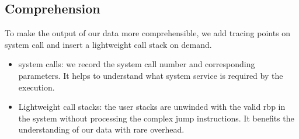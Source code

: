 \subsection{Comprehension}
To make the output of our data more comprehensible, we add tracing points on system call and insert a lightweight call stack on demand.
\begin{itemize}
	\item system calls: we record the system call number and corresponding parameters. It helps to understand what system service is required by the execution.
	\item Lightweight call stacks: the user stacks are unwinded with the valid rbp in the system without processing the complex jump instructions. It benefits the understanding of our data with rare overhead.
\end{itemize}
